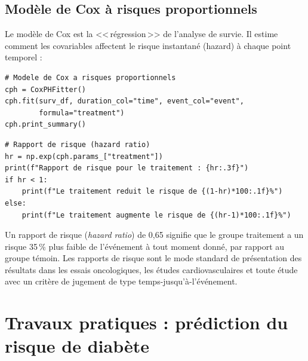 \subsection{Mod\`ele de Cox \`a risques proportionnels}

Le mod\`ele de Cox est la <<\,r\'egression\,>> de l'analyse de survie. Il estime comment les covariables affectent le risque instantan\'e (hazard) \`a chaque point temporel :

\begin{verbatim}
# Modele de Cox a risques proportionnels
cph = CoxPHFitter()
cph.fit(surv_df, duration_col="time", event_col="event",
        formula="treatment")
cph.print_summary()
\end{verbatim}

\begin{verbatim}
# Rapport de risque (hazard ratio)
hr = np.exp(cph.params_["treatment"])
print(f"Rapport de risque pour le traitement : {hr:.3f}")
if hr < 1:
    print(f"Le traitement reduit le risque de {(1-hr)*100:.1f}%")
else:
    print(f"Le traitement augmente le risque de {(hr-1)*100:.1f}%")
\end{verbatim}

\begin{clinicalnote}
Un rapport de risque (\emph{hazard ratio}) de 0,65 signifie que le groupe traitement a un risque 35\,\% plus faible de l'\'ev\'enement \`a tout moment donn\'e, par rapport au groupe t\'emoin. Les rapports de risque sont le mode standard de pr\'esentation des r\'esultats dans les essais oncologiques, les \'etudes cardiovasculaires et toute \'etude avec un crit\`ere de jugement de type temps-jusqu'\`a-l'\'ev\'enement.
\end{clinicalnote}

\section{Travaux pratiques : pr\'ediction du risque de diab\`ete}

